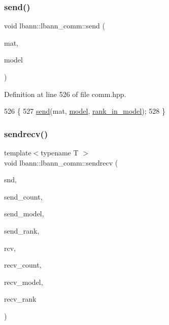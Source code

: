 \subsubsection{\texorpdfstring{send()}{send()}\hspace{0.1cm}{\footnotesize\ttfamily [6/6]}}
{\footnotesize\ttfamily void lbann\+::lbann\+\_\+comm\+::send (\begin{DoxyParamCaption}\item[{const \hyperlink{base_8hpp_a0fab5387556805cfeac3e7e567bf66c5}{Dist\+Mat} \&}]{mat,  }\item[{int}]{model }\end{DoxyParamCaption})\hspace{0.3cm}{\ttfamily [inline]}}



Definition at line 526 of file comm.\+hpp.


\begin{DoxyCode}
526                                            \{
527     \hyperlink{classlbann_1_1lbann__comm_a086078b881e7250df140ac116adb1939}{send}(mat, \hyperlink{namespacelbann_adee41f31f15f3906cbdcce4a1417eb56a20f35e630daf44dbfa4c3f68f5399d8c}{model}, \hyperlink{classlbann_1_1lbann__comm_a0dcccd57c2b591eb7682e192e0a09033}{rank\_in\_model});
528   \}
\end{DoxyCode}
\mbox{\label{classlbann_1_1lbann__comm_a6314e3b07b21b8fb0cd2ebe1e49dddb9}} 
\subsubsection{\texorpdfstring{sendrecv()}{sendrecv()}\hspace{0.1cm}{\footnotesize\ttfamily [1/2]}}
{\footnotesize\ttfamily template$<$typename T $>$ \\
void lbann\+::lbann\+\_\+comm\+::sendrecv (\begin{DoxyParamCaption}\item[{const T $\ast$}]{snd,  }\item[{int}]{send\+\_\+count,  }\item[{int}]{send\+\_\+model,  }\item[{int}]{send\+\_\+rank,  }\item[{T $\ast$}]{rcv,  }\item[{int}]{recv\+\_\+count,  }\item[{int}]{recv\+\_\+model,  }\item[{int}]{recv\+\_\+rank }\end{DoxyParamCaption})\hspace{0.3cm}{\ttfamily [inline]}}

